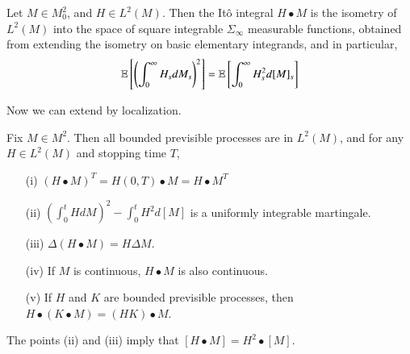\begin{theorem}
    Let $M \in M_0^2$, and $H \in L^2(M)$. Then the It\^{o} integral $H \bullet M$ is the isometry of $L^2(M)$ into the space of square integrable $\Sigma_\infty$ measurable functions, obtained from extending the isometry on basic elementary integrands, and in particular,
    \[ \operatorname{\mathbb{E}} \left[ \left( \int_0^\infty H_s dM_s \right)^2 \right] = \operatorname{\mathbb{E}} \left[ \int_0^\infty H_s^2 d[M]_s \right] \]
\end{theorem}

Now we can extend by localization.

\begin{theorem}
    Fix $M \in M^2$. Then all bounded previsible processes are in $L^2(M)$, and for any $H \in L^2(M)$ and stopping time $T$,
    \begin{itemize}
        \item[(i)] $(H \bullet M)^T = H(0,T) \bullet M = H \bullet M^T$
        \item[(ii)] $\left( \int_0^t H dM \right)^2 - \int_0^t H^2 d[M]$ is a uniformly integrable martingale.
        \item[(iii)] $\Delta(H \bullet M) = H \Delta M$.
        \item[(iv)] If $M$ is continuous, $H \bullet M$ is also continuous.
        \item[(v)] If $H$ and $K$ are bounded previsible processes, then $H \bullet (K \bullet M) = (HK) \bullet M$.
    \end{itemize}
    The points (ii) and (iii) imply that $[H \bullet M] = H^2 \bullet [M]$.
\end{theorem}
